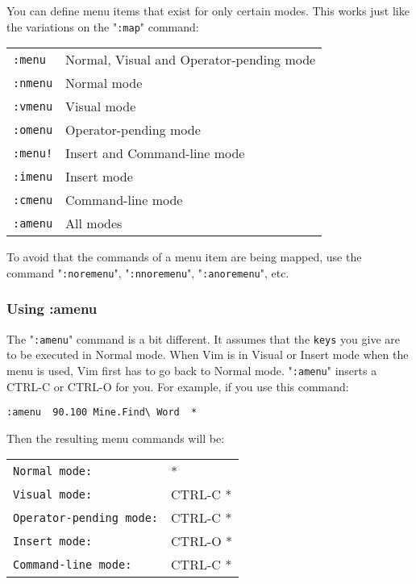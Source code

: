 You can define menu items that exist for only certain modes.
This works just like the variations on the "\texttt{:map}" command:
\begin{center} \begin{tabular}{l l}
				\texttt{:menu} & Normal, Visual and Operator-pending mode \\
				\texttt{:nmenu} & Normal mode \\
				\texttt{:vmenu} & Visual mode \\
				\texttt{:omenu} & Operator-pending mode \\
				\texttt{:menu!} & Insert and Command-line mode \\
				\texttt{:imenu} & Insert mode \\
				\texttt{:cmenu} & Command-line mode \\
				\texttt{:amenu} & All modes \\
\end{tabular} \end{center}
To avoid that the commands of a menu item are being mapped, use the command "\texttt{:noremenu}", "\texttt{:nnoremenu}", "\texttt{:anoremenu}", etc.

\subsubsection{Using :amenu}
The "\texttt{:amenu}" command is a bit different.
It assumes that the \texttt{{keys}} you give are to be executed in Normal mode.
When Vim is in Visual or Insert mode when the menu is used, Vim first has to go back to Normal mode.
"\texttt{:amenu}" inserts a CTRL-C or CTRL-O for you.
For example, if you use this command:

\begin{Verbatim}[samepage=true]
 :amenu  90.100 Mine.Find\ Word  *
\end{Verbatim}

Then the resulting menu commands will be:

\begin{center} \begin{tabular}{l l}
				\texttt{Normal mode:} & * \\
				\texttt{Visual mode:} & CTRL-C * \\
				\texttt{Operator-pending mode:} & CTRL-C * \\
				\texttt{Insert mode:} & CTRL-O * \\
				\texttt{Command-line mode:} & CTRL-C * \\
\end{tabular} \end{center}


